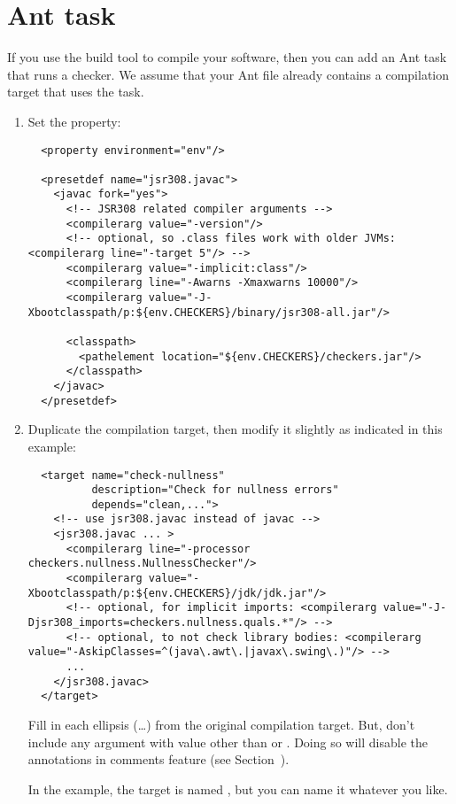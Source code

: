 \section{Ant task\label{ant-task}}

If you use the  build tool to compile
your software, then you can add an Ant task that runs a checker.  We assume
that your Ant file already contains a compilation target that uses the
 task.

\begin{enumerate}
\item
Set the  property:

\begin{smaller}
\begin{Verbatim}
  <property environment="env"/>

  <presetdef name="jsr308.javac">
    <javac fork="yes">
      <!-- JSR308 related compiler arguments -->
      <compilerarg value="-version"/>
      <!-- optional, so .class files work with older JVMs: <compilerarg line="-target 5"/> -->
      <compilerarg value="-implicit:class"/>
      <compilerarg line="-Awarns -Xmaxwarns 10000"/>
      <compilerarg value="-J-Xbootclasspath/p:${env.CHECKERS}/binary/jsr308-all.jar"/>

      <classpath>
        <pathelement location="${env.CHECKERS}/checkers.jar"/>
      </classpath>
    </javac>
  </presetdef>
\end{Verbatim}
\end{smaller}

\item Duplicate the compilation target, then modify it slightly as
indicated in this example:

\begin{smaller}
\begin{Verbatim}
  <target name="check-nullness"
          description="Check for nullness errors"
          depends="clean,...">
    <!-- use jsr308.javac instead of javac -->
    <jsr308.javac ... >
      <compilerarg line="-processor checkers.nullness.NullnessChecker"/>
      <compilerarg value="-Xbootclasspath/p:${env.CHECKERS}/jdk/jdk.jar"/>
      <!-- optional, for implicit imports: <compilerarg value="-J-Djsr308_imports=checkers.nullness.quals.*"/> -->
      <!-- optional, to not check library bodies: <compilerarg value="-AskipClasses=^(java\.awt\.|javax\.swing\.)"/> -->
      ...
    </jsr308.javac>
  </target>
\end{Verbatim}
\end{smaller}

Fill in each ellipsis (\ldots) from the original compilation target.  But,
don't include any  argument with value other than 
or .  Doing so will disable the annotations in
comments feature (see Section~).

In the example, the target is named , but you can
name it whatever you like.
\end{enumerate}

